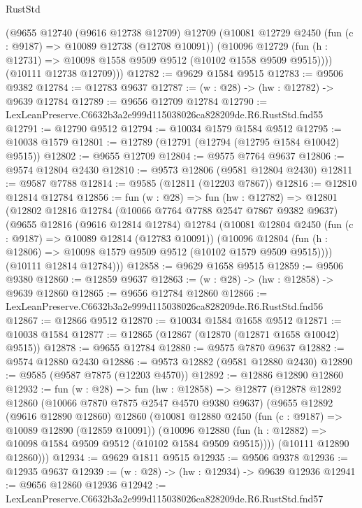 \begin{lexlean}{RustStd}
\begin{coremodule}
      (@9655
        @12740
        (@9616 @12738 @12709)
        @12709
        (@10081
          @12729
          @2450
          (fun (c : @9187) => @10089 @12738 (@12708 @10091))
          (@10096 @12729 (fun (h : @12731) => @10098 @1558 @9509 @9512 (@10102 @1558 @9509 @9515))))
        (@10111 @12738 @12709)))
@12782 := @9629 @1584 @9515
@12783 := @9506 @9382
@12784 := @12783 @9637
@12787 := (w : @28) -> (hw : @12782) -> @9639 @12784
@12789 := @9656 @12709 @12784
@12790 := LexLeanPreserve.C6632b3a2e999d115038026ca828209de.R6.RustStd.fnd55
@12791 := @12790 @9512
@12794 := @10034 @1579 @1584 @9512
@12795 := @10038 @1579
@12801 := @12789 (@12791 (@12794 (@12795 @1584 @10042) @9515))
@12802 := @9655 @12709
@12804 := @9575 @7764 @9637
@12806 := @9574 @12804 @2430
@12810 := @9573 @12806 (@9581 @12804 @2430)
@12811 := @9587 @7788
@12814 := @9585 (@12811 (@12203 @7867))
@12816 := @12810 @12814 @12784
@12856 := fun (w : @28) =>
  fun (hw : @12782) =>
  @12801
    (@12802
      @12816
      @12784
      (@10066 @7764 @7788 @2547 @7867 @9382 @9637)
      (@9655
        @12816
        (@9616 @12814 @12784)
        @12784
        (@10081
          @12804
          @2450
          (fun (c : @9187) => @10089 @12814 (@12783 @10091))
          (@10096 @12804 (fun (h : @12806) => @10098 @1579 @9509 @9512 (@10102 @1579 @9509 @9515))))
        (@10111 @12814 @12784)))
@12858 := @9629 @1658 @9515
@12859 := @9506 @9380
@12860 := @12859 @9637
@12863 := (w : @28) -> (hw : @12858) -> @9639 @12860
@12865 := @9656 @12784 @12860
@12866 := LexLeanPreserve.C6632b3a2e999d115038026ca828209de.R6.RustStd.fnd56
@12867 := @12866 @9512
@12870 := @10034 @1584 @1658 @9512
@12871 := @10038 @1584
@12877 := @12865 (@12867 (@12870 (@12871 @1658 @10042) @9515))
@12878 := @9655 @12784
@12880 := @9575 @7870 @9637
@12882 := @9574 @12880 @2430
@12886 := @9573 @12882 (@9581 @12880 @2430)
@12890 := @9585 (@9587 @7875 (@12203 @4570))
@12892 := @12886 @12890 @12860
@12932 := fun (w : @28) =>
  fun (hw : @12858) =>
  @12877
    (@12878
      @12892
      @12860
      (@10066 @7870 @7875 @2547 @4570 @9380 @9637)
      (@9655
        @12892
        (@9616 @12890 @12860)
        @12860
        (@10081
          @12880
          @2450
          (fun (c : @9187) => @10089 @12890 (@12859 @10091))
          (@10096 @12880 (fun (h : @12882) => @10098 @1584 @9509 @9512 (@10102 @1584 @9509 @9515))))
        (@10111 @12890 @12860)))
@12934 := @9629 @1811 @9515
@12935 := @9506 @9378
@12936 := @12935 @9637
@12939 := (w : @28) -> (hw : @12934) -> @9639 @12936
@12941 := @9656 @12860 @12936
@12942 := LexLeanPreserve.C6632b3a2e999d115038026ca828209de.R6.RustStd.fnd57

\end{coremodule}
\end{lexlean}
